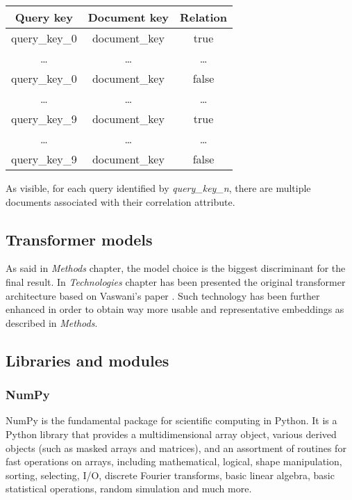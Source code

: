 \documentclass[\main/main.tex]{subfiles}
\begin{document}
\begin{center}
    \begin{tabular}{||c | c c||} 
     \hline
     Query key & Document key & Relation\\ [0.5ex] 
     \hline\hline
     query\_key\_0 & document\_key & true \\ 
     \hline
     \dots & \dots & \dots\\
     \hline
     query\_key\_0 & document\_key & false\\
     \hline
     \dots & \dots & \dots\\
     \hline
     query\_key\_9 & document\_key & true \\ 
     \hline
     \dots & \dots & \dots\\
     \hline
     query\_key\_9 & document\_key & false\\
     \hline
    \end{tabular}
\end{center}
As visible, for each query identified by \emph{query\_key\_n}, there are multiple documents associated with their correlation attribute.
\subsection{Transformer models}
As said in \emph{Methods} chapter, the model choice is the biggest discriminant for the final result. In \emph{Technologies} chapter has been presented the original transformer architecture based on Vaswani's paper \cite{vaswani2017attention}. Such technology has been further enhanced in order to obtain way more usable and representative embeddings as described in \emph{Methods}. 
\subsection{Libraries and modules}
\subsubsection{NumPy}
NumPy is the fundamental package for scientific computing in Python. It is a Python library that provides a multidimensional array object, various derived objects (such as masked arrays and matrices), and an assortment of routines for fast operations on arrays, including mathematical, logical, shape manipulation, sorting, selecting, I/O, discrete Fourier transforms, basic linear algebra, basic statistical operations, random simulation and much more\cite{harris2020array}.
\end{document}
